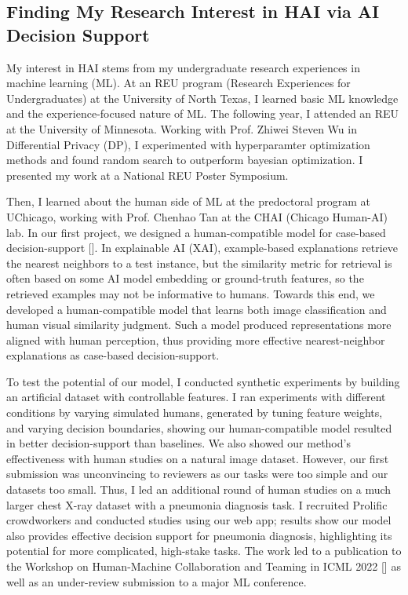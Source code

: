 \subsection*{Finding My Research Interest in HAI via AI Decision Support}


My interest in HAI stems from my undergraduate research experiences in machine learning (ML). At an REU program (Research Experiences for Undergraduates) at the University of North Texas, I learned basic ML knowledge and the experience-focused nature of ML. The following year, I attended an REU at the University of Minnesota. Working with Prof. Zhiwei Steven Wu in Differential Privacy (DP), I experimented with hyperparamter optimization methods and found random search to outperform bayesian optimization. I presented my work at a National REU Poster Symposium. 







Then, I learned about the human side of ML at the predoctoral program at UChicago, working with Prof. Chenhao Tan at the CHAI (Chicago Human-AI) lab. In our first project, we designed a human-compatible model for case-based decision-support
[]. 
In explainable AI (XAI), example-based explanations retrieve the nearest neighbors to a test instance, but the similarity metric for retrieval is often based on some AI model embedding or ground-truth features, so the retrieved examples may not be informative to humans. 
Towards this end, we developed a human-compatible model that learns both image classification and human visual similarity judgment. Such a model produced representations more aligned with human perception, thus providing more effective nearest-neighbor explanations as case-based decision-support.



To test the potential of our model, I conducted synthetic experiments by building an artificial dataset with controllable features. I ran experiments with different conditions by varying simulated humans, generated by tuning feature weights, and varying decision boundaries, showing our human-compatible model resulted in better decision-support than baselines. We also showed our method's effectiveness with human studies on a natural image dataset. However, our first submission was unconvincing to reviewers as our tasks were too simple and our datasets too small. Thus, I led an additional round of human studies on a much larger chest X-ray dataset with a pneumonia diagnosis task. I recruited Prolific crowdworkers and conducted studies using our web app; results show our model also provides effective decision support for pneumonia diagnosis, highlighting its potential for more complicated, high-stake tasks. 
The work led to a publication to the Workshop on Human-Machine Collaboration and Teaming in ICML 2022 [] as well as an under-review submission to a major ML conference.


